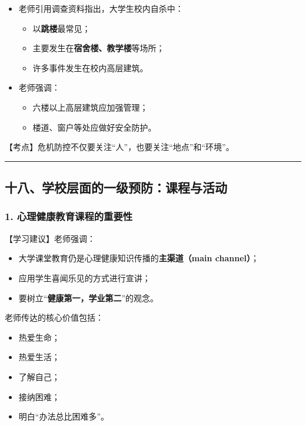 \documentclass[
  chinese,
  9pt,
  a4paper,
]{ctexart}
\providecommand{\tightlist}{%
  \setlength{\itemsep}{0pt}\setlength{\parskip}{0pt}}
\begin{document}
\begin{itemize}
\item
  老师引用调查资料指出，大学生校内自杀中：

  \begin{itemize}
  \tightlist
  \item
    以\textbf{跳楼}最常见；
  \item
    主要发生在\textbf{宿舍楼、教学楼}等场所；
  \item
    许多事件发生在校内高层建筑。
  \end{itemize}
\item
  老师强调：

  \begin{itemize}
  \tightlist
  \item
    六楼以上高层建筑应加强管理；
  \item
    楼道、窗户等处应做好安全防护。
  \end{itemize}
\end{itemize}

【考点】危机防控不仅要关注``人''，也要关注``地点''和``环境''。

\begin{center}\rule{0.5\linewidth}{0.5pt}\end{center}

\subsection{十八、学校层面的一级预防：课程与活动}\label{ux5341ux516bux5b66ux6821ux5c42ux9762ux7684ux4e00ux7ea7ux9884ux9632ux8bfeux7a0bux4e0eux6d3bux52a8}

\subsubsection{1.
心理健康教育课程的重要性}\label{ux5fc3ux7406ux5065ux5eb7ux6559ux80b2ux8bfeux7a0bux7684ux91cdux8981ux6027}

【学习建议】老师强调：

\begin{itemize}
\tightlist
\item
  大学课堂教育仍是心理健康知识传播的\textbf{主渠道（main channel）}；
\item
  应用学生喜闻乐见的方式进行宣讲；
\item
  要树立``\textbf{健康第一，学业第二}''的观念。
\end{itemize}

老师传达的核心价值包括：

\begin{itemize}
\tightlist
\item
  热爱生命；
\item
  热爱生活；
\item
  了解自己；
\item
  接纳困难；
\item
  明白``办法总比困难多''。
\end{itemize}
\end{document}

